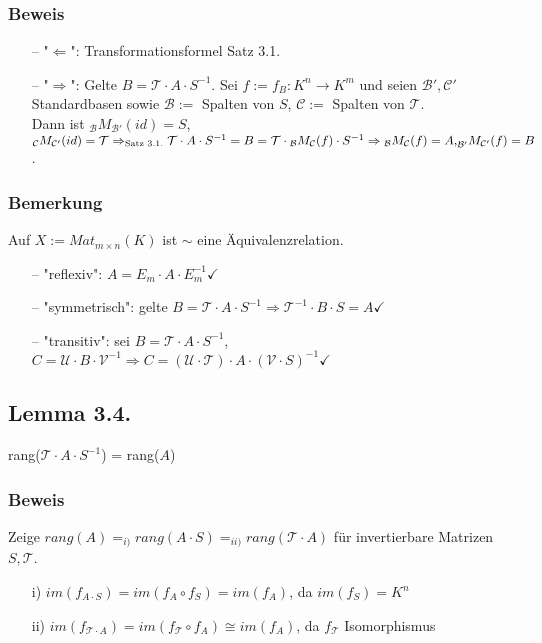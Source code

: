 \documentclass[a4paper, 12pt]{extarticle}
\newcommand{\tn}[1]{\textnormal {#1}}
\begin{document}
\subsubsection*{Beweis}
\begin{itemize}
	\item[--] "$\Leftarrow$": Transformationsformel Satz 3.1.
	\item[--] "$\Rightarrow$": Gelte $B = \mathcal{T} \cdot A \cdot S^{-1}$. Sei $f := f_B: K^n \longrightarrow K^m$ und seien $\mathcal{B'}, \mathcal{C'}$ Standardbasen sowie $\mathcal{B} := $ Spalten von $S$, $\mathcal{C} := $ Spalten von $\mathcal{T}$.\\ Dann ist ${_\mathcal B}M_\mathcal{B'}(id) = S$, $_\mathcal{C}M_\mathcal{C'}(id) = \mathcal{T} \Rightarrow_{\tn{Satz 3.1.}} \mathcal{T} \cdot A \cdot S^{-1} = B = \mathcal{T} \cdot {_\mathcal B}M_\mathcal{C}(f) \cdot S^{-1}\\ \Rightarrow {_\mathcal B}M_\mathcal{C}(f) = A\tn{,} _\mathcal{B'}M_\mathcal{C'}(f) = B$.
\end{itemize}
\subsubsection*{Bemerkung}
Auf $X := Mat_{m\times n}(K)$ ist $\sim$ eine Äquivalenzrelation.
\begin{itemize}
	\item[--] "reflexiv": $A = E_m \cdot A \cdot E_m^{-1} \checkmark$
	\item[--] "symmetrisch": gelte $B = \mathcal{T} \cdot A \cdot S^{-1} \Rightarrow \mathcal{T}^{-1} \cdot B \cdot S = A \checkmark$
	\item[--] "transitiv": sei $B = \mathcal{T} \cdot A \cdot S^{-1}$, $C = \mathcal{U} \cdot B \cdot \mathcal{V}^{-1} \Rightarrow C = (\mathcal{U} \cdot \mathcal{T}) \cdot A \cdot (\mathcal{V} \cdot S)^{-1} \checkmark$
\end{itemize}
\subsection*{Lemma 3.4.}
rang($\mathcal{T} \cdot A \cdot S^{-1}$) = rang($A$)
\subsubsection*{Beweis}
Zeige $rang(A) =_{i)} rang(A \cdot S) =_{ii)} rang(\mathcal{T} \cdot A)$ für invertierbare Matrizen $S, \mathcal{T}$.
\begin{itemize}
	\item[i)] $im(f_{A \cdot S}) = im(f_A \circ f_S) = im(f_A)$, da $im(f_S) = K^n$
	\item[ii)] $im(f_{\mathcal{T} \cdot A}) = im(f_\mathcal{T} \circ f_A) \cong im(f_A)$, da $f_\mathcal{T}$ Isomorphismus
\end{itemize}
\end{document}
